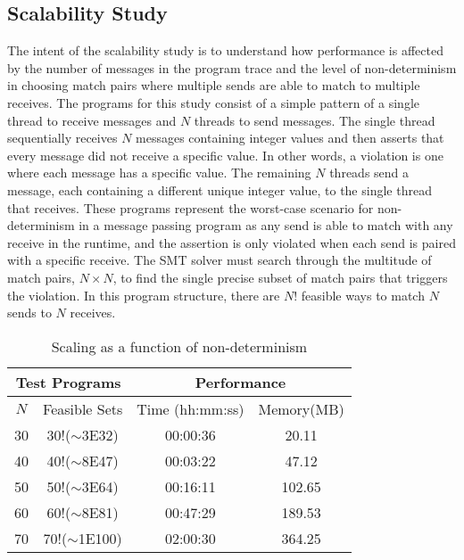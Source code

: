 \subsection{Scalability Study}

The intent of the scalability study is to understand how performance
is affected by the number of messages in the program trace and the
level of non-determinism in choosing match pairs where multiple sends
are able to match to multiple receives. The programs for this study
consist of a simple pattern of a single thread to receive messages and
$N$ threads to send messages. The single thread sequentially receives
$N$ messages containing integer values and then asserts that every
message did not receive a specific value. In other words, a violation
is one where each message has a specific value.  The remaining $N$
threads send a message, each containing a different unique integer
value, to the single thread that receives. These programs represent
the worst-case scenario for non-determinism in a message passing
program as any send is able to match with any receive in the runtime,
and the assertion is only violated when each send is paired with a
specific receive. The SMT solver must search through the multitude of
match pairs, $N \times N$, to find the single precise subset of
match pairs that triggers the violation. In this program structure,
there are $N!$ feasible ways to match $N$ sends to $N$ receives.

\begin{table}[h]
\begin{center}
\scriptsize
\caption{Scaling as a function of non-determinism \label{table:first}}
\begin{tabular}{|c|c|c|c|}
		\hline
         \multicolumn{2}{|c|}{Test Programs} & \multicolumn{2}{|c|}{Performance} \\ \hline
          $N$ & Feasible Sets &  Time (hh:mm:ss) & Memory(MB) \\ \hline
30& 30!($\sim$3E32)& 00:00:36&        20.11 \\
40& 40!($\sim$8E47)& 00:03:22&        47.12 \\
50& 50!($\sim$3E64)& 00:16:11&       102.65 \\
60& 60!($\sim$8E81)& 00:47:29&       189.53 \\
70& 70!($\sim$1E100)& 02:00:30&         364.25  \\
         \hline
		\end{tabular}
\end{center}
\end{table}

